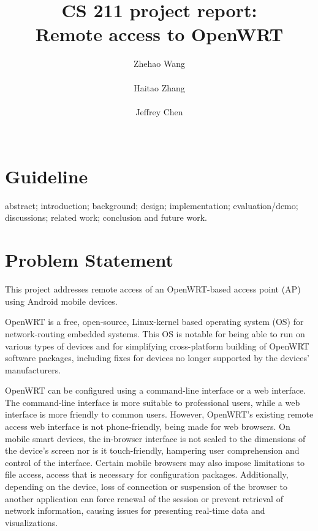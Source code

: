 \documentclass{sig-alternate-05-2015}
\begin{document}
	
	\title{CS 211 project report: \\Remote access to OpenWRT}
	
	
	\author{
		\alignauthor
		Zhehao Wang \\
               \\
		\alignauthor
		Haitao Zhang \\
               \\
		\alignauthor 
		Jeffrey Chen\\
               \\
	}
	
	\maketitle

	\section{Guideline}

	abstract; 
	introduction; 
	background;
	design; 
	implementation; 
	evaluation/demo; 
	discussions; 
	related work; 
	conclusion and future work.

	\section{Problem Statement}
	
	This project addresses remote access of an OpenWRT-based access point (AP) using Android mobile devices.

	OpenWRT is a free, open-source, Linux-kernel based operating system (OS) for network-routing embedded systems. This OS is notable for being able to run on various types of devices and for simplifying cross-platform building of OpenWRT software packages, including fixes for devices no longer supported by the devices' manufacturers.
	
	OpenWRT can be configured using a command-line interface or a web interface. The command-line interface is more suitable to professional users, while a web interface is more friendly to common users. However, OpenWRT's existing remote access web interface is not phone-friendly, being made for web browsers. On mobile smart devices, the in-browser interface is not scaled to the dimensions of the device's screen nor is it touch-friendly, hampering user comprehension and control of the interface. Certain mobile browsers may also impose limitations to file access, access that is necessary for configuration packages. Additionally, depending on the device, loss of connection or suspension of the browser to another application can force renewal of the session or prevent retrieval of network information, causing issues for presenting real-time data and visualizations.
	
\end{document}

